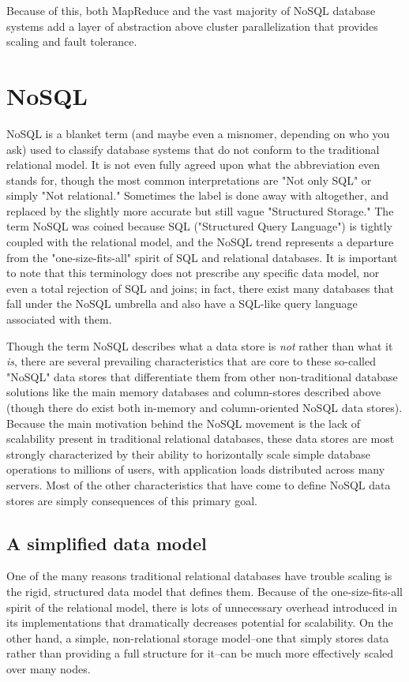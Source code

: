 \documentclass[11pt,a4paper]{report}
\begin{document}
Because of this, both MapReduce and the vast majority of NoSQL database systems add a layer of abstraction above cluster parallelization that provides scaling and fault tolerance.


\section{NoSQL}
NoSQL is a blanket term (and maybe even a misnomer, depending on who you ask) used to classify database systems that do not conform to the traditional relational model. It is not even fully agreed upon what the abbreviation even stands for, though the most common interpretations are "Not only SQL" or simply "Not relational."\cite{cattell2011scalable} Sometimes the label is done away with altogether, and replaced by the slightly more accurate but still vague "Structured Storage." The term NoSQL was coined because SQL ("Structured Query Language") is tightly coupled with the relational model, and the NoSQL trend represents a departure from the "one-size-fits-all" spirit of SQL and relational databases.\cite{strauch2011nosql}  It is important to note that this terminology does not prescribe any specific data model, nor even a total rejection of SQL and joins; in fact, there exist many databases that fall under the NoSQL umbrella and also have a SQL-like query language associated with them. 

Though the term NoSQL describes what a data store is \textit{not} rather than what it \textit{is}, there are several prevailing characteristics that are core to these so-called "NoSQL" data stores that differentiate them from other non-traditional database solutions like the main memory databases and column-stores described above (though there do exist both in-memory and column-oriented NoSQL data stores). Because the main motivation behind the NoSQL movement is the lack of scalability present in traditional relational databases, these data stores are most strongly characterized by their ability to horizontally scale simple database operations to millions of users, with application loads distributed across many servers.\cite{strauch2011nosql} Most of the other characteristics that have come to define NoSQL data stores are simply consequences of this primary goal.

\subsection{A simplified data model}
One of the many reasons traditional relational databases have trouble scaling is the rigid, structured data model that defines them. Because of the one-size-fits-all spirit of the relational model, there is lots of unnecessary overhead introduced in its implementations that dramatically decreases potential for scalability. On the other hand, a simple, non-relational storage model--one that simply stores data rather than providing a full structure for it--can be much more effectively scaled over many nodes. 
\end{document}
